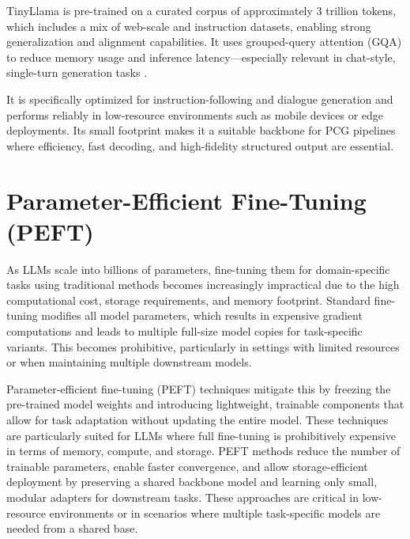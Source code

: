 TinyLlama \cite{tinyllama,zhang2024tinyllama} is pre-trained on a curated corpus of approximately 3 trillion tokens, which
includes a mix of web-scale and instruction datasets, enabling strong generalization and
alignment capabilities. It uses grouped-query attention (GQA) to reduce memory usage
and inference latency—especially relevant in chat-style, single-turn generation tasks \cite{lit-gpt,dao2023flashattention2}.

It is specifically optimized for instruction-following and dialogue generation and performs
reliably in low-resource environments such as mobile devices or edge deployments.
Its small footprint makes it a suitable backbone for PCG pipelines where efficiency, fast
decoding, and high-fidelity structured output are essential.

\section{Parameter-Efficient Fine-Tuning (PEFT)}

As LLMs scale into billions of parameters, fine-tuning them for domain-specific tasks
using traditional methods becomes increasingly impractical due to the high computational
cost, storage requirements, and memory footprint. Standard fine-tuning modifies
all model parameters, which results in expensive gradient computations and leads to multiple
full-size model copies for task-specific variants. This becomes prohibitive, particularly
in settings with limited resources or when maintaining multiple downstream models.

Parameter-efficient fine-tuning (PEFT) techniques mitigate this by freezing the pre-trained
model weights and introducing lightweight, trainable components that allow for
task adaptation without updating the entire model. These techniques are particularly
suited for LLMs where full fine-tuning is prohibitively expensive in terms of memory,
compute, and storage. PEFT methods reduce the number of trainable parameters, enable
faster convergence, and allow storage-efficient deployment by preserving a shared
backbone model and learning only small, modular adapters for downstream tasks. These
approaches are critical in low-resource environments or in scenarios where multiple task-specific
models are needed from a shared base.

